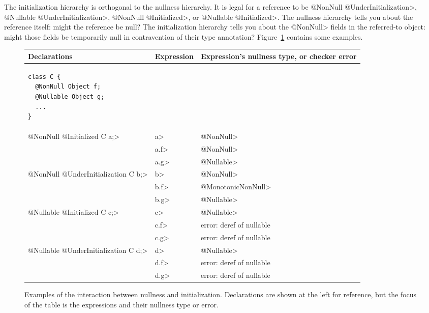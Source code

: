 The initialization hierarchy is orthogonal to the nullness hierarchy.  It
is legal for a reference to be \<@NonNull @UnderInitialization>, \<@Nullable @UnderInitialization>,
\<@NonNull @Initialized>, or \<@Nullable @Initialized>.  The nullness hierarchy tells
you about the reference itself:  might the reference be null?  The initialization
hierarchy tells you about the \<@NonNull> fields in the referred-to object:
might those fields be temporarily null in contravention of their
type annotation?
Figure~\ref{fig-initialization-examples} contains some examples.

\begin{figure}
\begin{tabular}{l|l|l}
Declarations & Expression & Expression's nullness type, or checker error \\ \hline
\begin{minipage}{1.5in}
\begin{Verbatim}
class C {
  @NonNull Object f;
  @Nullable Object g;
  ...
}
\end{Verbatim}
\end{minipage} & & \\ \cline{2-3}
\<@NonNull @Initialized C a;>
& \<a> & \<@NonNull> \\
& \<a.f> & \<@NonNull> \\
& \<a.g> & \<@Nullable> \\ \cline{2-3}
\<@NonNull @UnderInitialization C b;>
& \<b> & \<@NonNull> \\
& \<b.f> & \<@MonotonicNonNull> \\
& \<b.g> & \<@Nullable> \\ \cline{2-3}
\<@Nullable @Initialized C c;>
& \<c> & \<@Nullable> \\
& \<c.f> & error: deref of nullable \\
& \<c.g> & error: deref of nullable \\ \cline{2-3}
\<@Nullable @UnderInitialization C d;>
& \<d> & \<@Nullable> \\
& \<d.f> & error: deref of nullable \\
& \<d.g> & error: deref of nullable \\
\end{tabular}
\caption{Examples of the interaction between nullness and initialization.
  Declarations are shown at the left for reference, but the focus of the
  table is the expressions and their nullness type or error.}
\label{fig-initialization-examples}
\end{figure}


